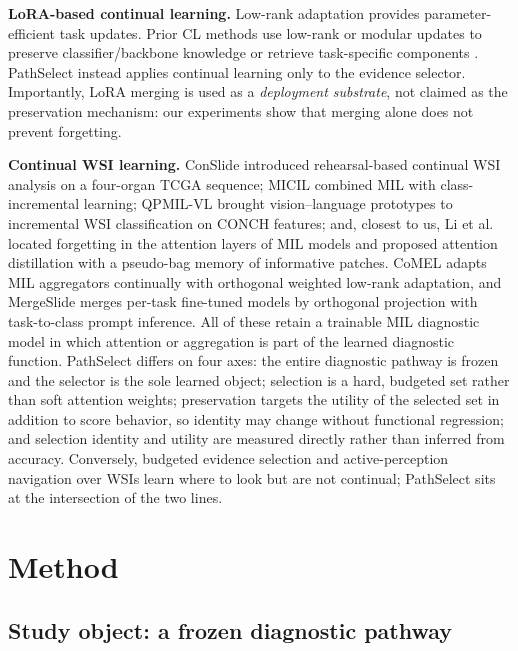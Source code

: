 \documentclass{article}
\begin{document}
\textbf{LoRA-based continual learning.}
Low-rank adaptation \cite{hu2022lora} provides parameter-efficient task updates.
Prior CL methods use low-rank or modular updates to preserve classifier/backbone knowledge or retrieve task-specific components \cite{liang2024inflora,wu2025sdlora,he2025cllora,chen2026flexem}.
PathSelect instead applies continual learning only to the evidence selector.
Importantly, LoRA merging is used as a \emph{deployment substrate}, not claimed as the preservation mechanism: our experiments show that merging alone does not prevent forgetting.

\textbf{Continual WSI learning.} ConSlide \cite{huang2023conslide} introduced rehearsal-based continual WSI analysis on a four-organ TCGA sequence; MICIL \cite{meseguer2024micil} combined MIL with class-incremental learning; QPMIL-VL \cite{gou2025qpmil} brought vision--language prototypes to incremental WSI classification on CONCH features; and, closest to us, Li et al.\ \cite{li2025akd} located forgetting in the attention layers of MIL models and proposed attention distillation with a pseudo-bag memory of informative patches. CoMEL \cite{lee2025comel} adapts MIL aggregators continually with orthogonal weighted low-rank adaptation, and MergeSlide \cite{bui2026mergeslide} merges per-task fine-tuned models by orthogonal projection with task-to-class prompt inference. All of these retain a trainable MIL diagnostic model in which attention or aggregation is part of the learned diagnostic function. PathSelect differs on four axes: the entire diagnostic pathway is frozen and the selector is the sole learned object; selection is a hard, budgeted set rather than soft attention weights; preservation targets the utility of the selected set in addition to score behavior, so identity may change without functional regression; and selection identity and utility are measured directly rather than inferred from accuracy. Conversely, budgeted evidence selection \cite{huang2026histoselect} and active-perception navigation over WSIs \cite{chen2026adaptivepath} learn where to look but are not continual; PathSelect sits at the intersection of the two lines.

\section{Method}
\label{sec:method}

\subsection{Study object: a frozen diagnostic pathway}
\label{ssec:setup}
\end{document}
